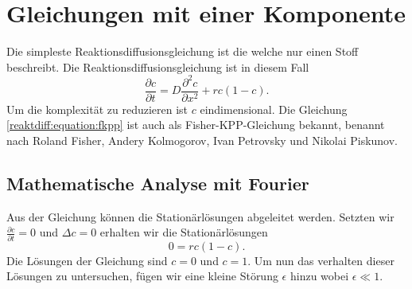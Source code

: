 %
%
%
%
\section{Gleichungen mit einer Komponente
\label{reaktdiff:section:einKomponent}}
Die simpleste Reaktionsdiffusionsgleichung ist die welche nur einen Stoff beschreibt.
Die Reaktionsdiffusionsgleichung ist in diesem Fall
\begin{equation}
\label{reaktdiff:equation:fkpp}
\frac{\partial c}{\partial t} = D \frac{\partial^2 c}{\partial x^2} + rc(1-c).
\end{equation}
Um die komplexität zu reduzieren ist \(c\) eindimensional. 
Die Gleichung \ref{reaktdiff:equation:fkpp} ist auch als Fisher-KPP-Gleichung\cite{reaktdiff:wikipedia_kpp_fisher} bekannt, benannt nach Roland Fisher, Andery Kolmogorov, Ivan Petrovsky und Nikolai Piskunov.

\subsection{Mathematische Analyse mit Fourier
\label{reaktdiff:subsection:fkppmathe}}
Aus der Gleichung können die Stationärlösungen abgeleitet werden.
Setzten wir \(\frac{\partial c}{\partial t} = 0\) und \(\Delta c = 0\) erhalten wir die Stationärlösungen
\begin{equation*}
\label{reaktdiff:equation:stationaer}
0 = rc(1-c).
\end{equation*}
Die Lösungen der Gleichung sind \(c = 0\) und \(c = 1\).
Um nun das verhalten dieser Lösungen zu untersuchen, fügen wir eine kleine Störung \(\epsilon\) hinzu wobei \(\epsilon \ll 1\).

